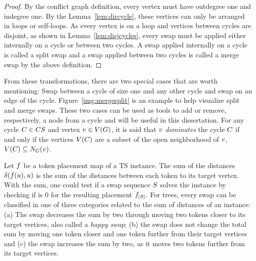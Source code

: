 \documentclass[msc,english,table,xcdraw]{ppgccufmg}
\begin{document}
\begin{proof}
By the conflict graph definition, every vertex must have outdegree one and 
indegree one.
By the Lemma~\ref{lem:dircycle}, these vertices can only be arranged in loops 
or self-loops.
As every vertex is on a loop and vertices between cycles are disjoint, as shown
in Lemma~\ref{lem:disjcycles}, every swap must be applied either internally on
a cycle or between two cycles.
A swap applied internally on a cycle is called a split swap and a swap applied
between two cycles is called a merge swap by the above definition.
\end{proof}

From these transformations, there are two special cases that are worth 
mentioning: Swap between a cycle of size one and any other cycle and swap on an 
edge of the cycle.
Figure~\ref{img:mergesplit} is an example to help visualize split and merge swaps.
These two cases can be used as tools to add or remove, respectively, a node from 
a cycle and will be useful in this dissertation.
For any cycle $C \in CS$ and vertex $v \in V(G)$,
it is said that $v$ \textit{dominates} the cycle $C$ if and only if
the vertices $V(C)$ are a subset of the open neighborhood of 
$v$, $V(C) \subseteq N_{G}(v)$.



Let $f$ be a token placement map of a TS instance.
The sum of the distances $\delta(f(u), u)$
is the sum of the distances between each token to its target vertex. 
With the sum, one could test if a swap sequence $S$ solves the instance
by checking if is 0 for the resulting placement $f_{|S|}$.
For trees, every swap can be classified in one of three categories related to 
the sum of distances of an instance: (a) The swap decreases the sum by two 
through moving two tokens closer to its target vertices, also called a 
\textit{happy swap}; (b) the swap does not change the total sum by moving one 
token closer and one token further from their target vertices and (c) the swap 
increases the sum by two, as it moves two tokens further from its target 
vertices.
\end{document}
